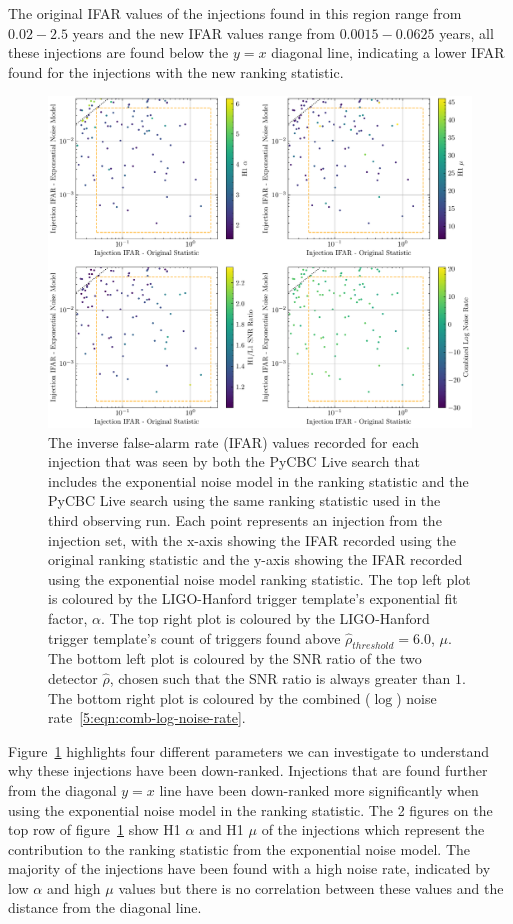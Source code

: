 %
The original IFAR values of the injections found in this region range from $0.02 - 2.5$ years and the new IFAR values range from $0.0015 - 0.0625$ years, all these injections are found below the $y = x$ diagonal line, indicating a lower IFAR found for the injections with the new ranking statistic. 
%
\begin{figure}
    \centering
    \includegraphics[width=1\textwidth]{images/5_pycbclive/regions/fits_only_ifar_vs_ifar_bottom_left_region_subplots.pdf}
    \caption{The inverse false-alarm rate (IFAR) values recorded for each injection that was seen by both the PyCBC Live search that includes the exponential noise model in the ranking statistic and the PyCBC Live search using the same ranking statistic used in the third observing run. Each point represents an injection from the injection set, with the x-axis showing the IFAR recorded using the original ranking statistic and the y-axis showing the IFAR recorded using the exponential noise model ranking statistic. The top left plot is coloured by the LIGO-Hanford trigger template's exponential fit factor, $\alpha$. The top right plot is coloured by the LIGO-Hanford trigger template's count of triggers found above $\hat{\rho}_{threshold} = 6.0$, $\mu$. The bottom left plot is coloured by the SNR ratio of the two detector $\hat{\rho}$, chosen such that the SNR ratio is always greater than $1$. The bottom right plot is coloured by the combined ($\log$) noise rate~\ref{5:eqn:comb-log-noise-rate}.}
    \label{5:fig:bottom-left-subplots}
\end{figure}
%
Figure~\ref{5:fig:bottom-left-subplots} highlights four different parameters we can investigate to understand why these injections have been down-ranked. Injections that are found further from the diagonal $y = x$ line have been down-ranked more significantly when using the exponential noise model in the ranking statistic. The 2 figures on the top row of figure~\ref{5:fig:bottom-left-subplots} show H1 $\alpha$ and H1 $\mu$ of the injections which represent the contribution to the ranking statistic from the exponential noise model. The majority of the injections have been found with a high noise rate, indicated by low $\alpha$ and high $\mu$ values but there is no correlation between these values and the distance from the diagonal line.

